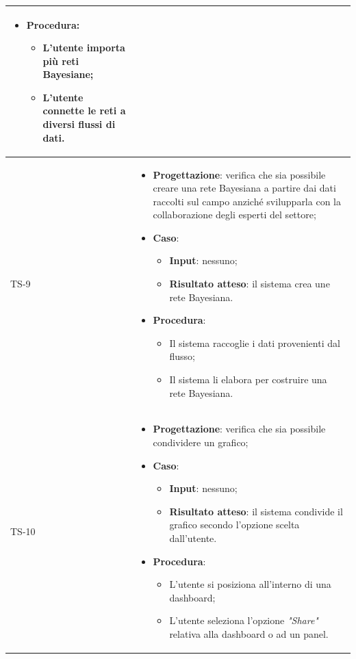 \begin{longtable}{|C{2.5cm}|C{13cm}|}
\begin{itemize}
\begin{itemize}
	\end{itemize}
	\item \textbf{Procedura}:
	\begin{itemize}
		\item L'utente importa più reti Bayesiane;
		\item L'utente connette le reti a diversi flussi di dati.
	\end{itemize} 
\end{itemize} \\
\hline
	{TS-9} &
\begin{itemize}
	\item \textbf{Progettazione}: verifica che sia  possibile creare una rete
	Bayesiana a partire dai dati raccolti sul campo anziché svilupparla con la
	collaborazione degli esperti del settore;
	\item \textbf{Caso}: 
	\begin{itemize}
		\item \textbf{Input}: nessuno;
		\item \textbf{Risultato atteso}: il sistema crea une rete Bayesiana.
	\end{itemize}
	\item \textbf{Procedura}:
	\begin{itemize}
		\item Il sistema raccoglie i dati provenienti dal flusso;
		\item Il sistema li elabora per costruire una rete Bayesiana.
	\end{itemize} 
\end{itemize} \\
\hline
	{TS-10} &
\begin{itemize}
	\item \textbf{Progettazione}: verifica che sia possibile condividere un
	grafico;
	\item \textbf{Caso}: 
	\begin{itemize}
		\item \textbf{Input}: nessuno;
		\item \textbf{Risultato atteso}: il sistema condivide il grafico secondo l'opzione scelta dall'utente.
	\end{itemize}
	\item \textbf{Procedura}:
	\begin{itemize}
		\item L'utente si posiziona all'interno di una dashboard;
		\item L'utente seleziona l'opzione \emph{"Share"} relativa alla dashboard o ad un panel.

\end{itemize}
\end{itemize}
\end{longtable}
